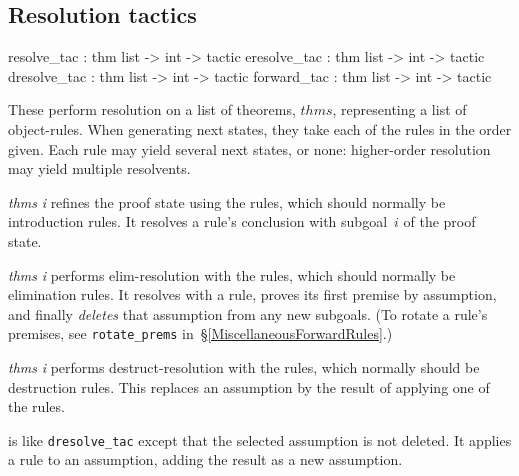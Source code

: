 \subsection{Resolution tactics}
\begin{ttbox} 
resolve_tac  : thm list -> int -> tactic
eresolve_tac : thm list -> int -> tactic
dresolve_tac : thm list -> int -> tactic
forward_tac  : thm list -> int -> tactic 
\end{ttbox}
These perform resolution on a list of theorems, $thms$, representing a list
of object-rules.  When generating next states, they take each of the rules
in the order given.  Each rule may yield several next states, or none:
higher-order resolution may yield multiple resolvents.
\begin{ttdescription}
\item[\ttindexbold{resolve_tac} {\it thms} {\it i}] 
  refines the proof state using the rules, which should normally be
  introduction rules.  It resolves a rule's conclusion with
  subgoal~$i$ of the proof state.

\item[\ttindexbold{eresolve_tac} {\it thms} {\it i}] 
  performs elim-resolution with the rules, which should normally be
  elimination rules.  It resolves with a rule, proves its first premise by
  assumption, and finally \emph{deletes} that assumption from any new
  subgoals.  (To rotate a rule's premises,
  see \texttt{rotate_prems} in~{\S}\ref{MiscellaneousForwardRules}.)

\item[\ttindexbold{dresolve_tac} {\it thms} {\it i}] 
  performs destruct-resolution with the rules, which normally should
  be destruction rules.  This replaces an assumption by the result of
  applying one of the rules.

\item[\ttindexbold{forward_tac}]
  is like {\tt dresolve_tac} except that the selected assumption is not
  deleted.  It applies a rule to an assumption, adding the result as a new
  assumption.
\end{ttdescription}

